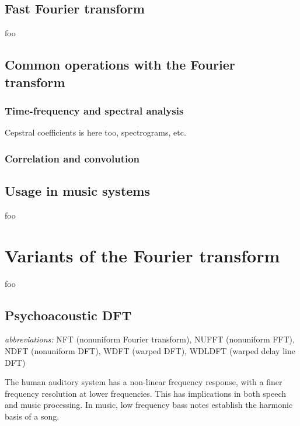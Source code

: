 \documentclass[letter,12pt,notitlepage]{article}
\begin{document}

\subsection{Fast Fourier transform}

foo

\subsection{Common operations with the Fourier transform}

\subsubsection{Time-frequency and spectral analysis}

Cepstral coefficients is here too, spectrograms, etc.

\subsubsection{Correlation and convolution}

\subsection{Usage in music systems}

foo

\section{Variants of the Fourier transform}

foo

\subsection{Psychoacoustic DFT}

\qquad \textit{abbreviations:} NFT (nonuniform Fourier transform), NUFFT (nonuniform FFT), NDFT (nonuniform DFT), WDFT (warped DFT), WDLDFT (warped delay line DFT)

The human auditory system has a non-linear frequency response, with a finer frequency resolution at lower frequencies.  This has implications in both speech and music processing. In music, low frequency bass notes establish the harmonic basis of a song. 


\end{document}
